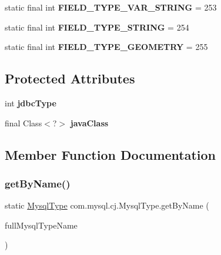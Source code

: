 \begin{DoxyCompactItemize}
\mbox{\label{enumcom_1_1mysql_1_1cj_1_1_mysql_type_a592cb3469b8ae61df443a8b2898dd6cb}} 
static final int {\bfseries F\+I\+E\+L\+D\+\_\+\+T\+Y\+P\+E\+\_\+\+V\+A\+R\+\_\+\+S\+T\+R\+I\+NG} = 253
\item 
\mbox{\label{enumcom_1_1mysql_1_1cj_1_1_mysql_type_af33c5594a7718c68ae6ce5df06c0e7db}} 
static final int {\bfseries F\+I\+E\+L\+D\+\_\+\+T\+Y\+P\+E\+\_\+\+S\+T\+R\+I\+NG} = 254
\item 
\mbox{\label{enumcom_1_1mysql_1_1cj_1_1_mysql_type_a79694009751354f81a8c9240dad04e9d}} 
static final int {\bfseries F\+I\+E\+L\+D\+\_\+\+T\+Y\+P\+E\+\_\+\+G\+E\+O\+M\+E\+T\+RY} = 255
\end{DoxyCompactItemize}
\subsection*{Protected Attributes}
\begin{DoxyCompactItemize}
\item 
\mbox{\label{enumcom_1_1mysql_1_1cj_1_1_mysql_type_aca13b73fe3014af5bc1c568024fd1063}} 
int {\bfseries jdbc\+Type}
\item 
\mbox{\label{enumcom_1_1mysql_1_1cj_1_1_mysql_type_acc498b3cc7c6fbb8dc86b72b60db102d}} 
final Class$<$?$>$ {\bfseries java\+Class}
\end{DoxyCompactItemize}


\subsection{Member Function Documentation}
\mbox{\label{enumcom_1_1mysql_1_1cj_1_1_mysql_type_a3f47c0e41170018df1c9bd922c33ed40}} 
\subsubsection{\texorpdfstring{get\+By\+Name()}{getByName()}}
{\footnotesize\ttfamily static \mbox{\hyperlink{enumcom_1_1mysql_1_1cj_1_1_mysql_type}{Mysql\+Type}} com.\+mysql.\+cj.\+Mysql\+Type.\+get\+By\+Name (\begin{DoxyParamCaption}\item[{String}]{full\+Mysql\+Type\+Name }\end{DoxyParamCaption})\hspace{0.3cm}{\ttfamily [static]}}

